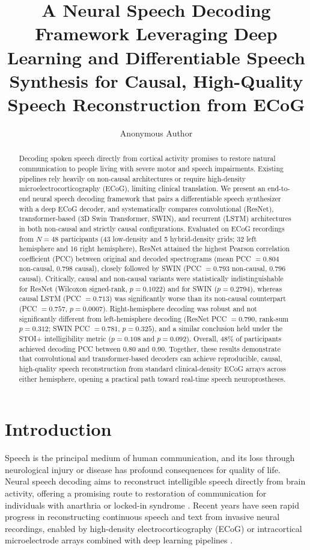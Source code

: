 \documentclass[11pt]{article}
\title{A Neural Speech Decoding Framework Leveraging Deep Learning and Differentiable Speech Synthesis for Causal, High-Quality Speech Reconstruction from ECoG}
\author[1]{Anonymous Author}
\affil[1]{Anonymous Institution}
\date{}
\begin{document}
\maketitle

\begin{abstract}
Decoding spoken speech directly from cortical activity promises to restore natural communication to people living with severe motor and speech impairments. Existing pipelines rely heavily on non-causal architectures or require high-density microelectrocorticography (ECoG), limiting clinical translation. We present an end-to-end neural speech decoding framework that pairs a differentiable speech synthesizer with a deep ECoG decoder, and systematically compares convolutional (ResNet), transformer-based (3D Swin Transformer, SWIN), and recurrent (LSTM) architectures in both non-causal and strictly causal configurations. Evaluated on ECoG recordings from $N=48$ participants (43 low-density and 5 hybrid-density grids; 32 left hemisphere and 16 right hemisphere), ResNet attained the highest Pearson correlation coefficient (PCC) between original and decoded spectrograms (mean PCC $= 0.804$ non-causal, $0.798$ causal), closely followed by SWIN (PCC $= 0.793$ non-causal, $0.796$ causal). Critically, causal and non-causal variants were statistically indistinguishable for ResNet (Wilcoxon signed-rank, $p = 0.1022$) and for SWIN ($p = 0.2794$), whereas causal LSTM (PCC $= 0.713$) was significantly worse than its non-causal counterpart (PCC $= 0.757$, $p = 0.0007$). Right-hemisphere decoding was robust and not significantly different from left-hemisphere decoding (ResNet PCC $= 0.790$, rank-sum $p = 0.312$; SWIN PCC $= 0.781$, $p = 0.325$), and a similar conclusion held under the STOI+ intelligibility metric ($p = 0.108$ and $p = 0.092$). Overall, 48\% of participants achieved decoding PCC between $0.80$ and $0.90$. Together, these results demonstrate that convolutional and transformer-based decoders can achieve reproducible, causal, high-quality speech reconstruction from standard clinical-density ECoG arrays across either hemisphere, opening a practical path toward real-time speech neuroprostheses.
\end{abstract}

\section{Introduction}

Speech is the principal medium of human communication, and its loss through neurological injury or disease has profound consequences for quality of life. Neural speech decoding aims to reconstruct intelligible speech directly from brain activity, offering a promising route to restoration of communication for individuals with anarthria or locked-in syndrome \cite{moses2021neuroprosthesis,willett2023highperformance,metzger2023highperformance}. Recent years have seen rapid progress in reconstructing continuous speech and text from invasive neural recordings, enabled by high-density electrocorticography (ECoG) or intracortical microelectrode arrays combined with deep learning pipelines \cite{anumanchipalli2019speech,makin2020machine,angrick2019speech,herff2019generating}.
\end{document}
